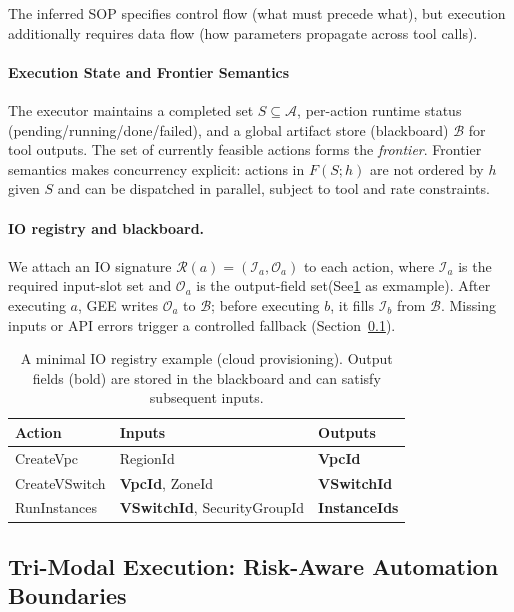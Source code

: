 \documentclass{article}
\theoremstyle{plain}
\theoremstyle{definition}
\theoremstyle{remark}
\begin{document}
The inferred SOP specifies control flow (what must precede what), but execution additionally requires data flow (how parameters propagate across tool calls). 
\paragraph{Execution State and Frontier Semantics}
\label{subsec:frontier}

The executor maintains a completed set $S\subseteq \mathcal{A}$, per-action runtime status (pending/running/done/failed), and a global artifact store (blackboard) $\mathcal{B}$ for tool outputs. The set of currently feasible actions forms the \emph{frontier}. Frontier semantics makes concurrency explicit: actions in $F(S;h)$ are not ordered by $h$ given $S$ and can be dispatched in parallel, subject to tool and rate constraints.

\paragraph{IO registry and blackboard.}
We attach an IO signature $\mathcal{R}(a)=(\mathcal{I}_a,\mathcal{O}_a)$ to each action, where $\mathcal{I}_a$ is the required input-slot set and $\mathcal{O}_a$ is the output-field set(See\ref{tab:io-registry-example} as exmample). After executing $a$, GEE writes $\mathcal{O}_a$ to $\mathcal{B}$; before executing $b$, it fills $\mathcal{I}_b$ from $\mathcal{B}$. Missing inputs or API errors trigger a controlled fallback (Section~\ref{subsec:modes}).

\begin{table}[t]
\centering
\caption{A minimal IO registry example (cloud provisioning). Output fields (bold) are stored in the blackboard and can satisfy subsequent inputs.}
\label{tab:io-registry-example}
\small
\setlength{\tabcolsep}{5pt}
\begin{tabular}{l l l}
\toprule
\textbf{Action} & \textbf{Inputs} & \textbf{Outputs} \\
\midrule
CreateVpc & RegionId & \textbf{VpcId} \\
CreateVSwitch & \textbf{VpcId}, ZoneId & \textbf{VSwitchId} \\
RunInstances & \textbf{VSwitchId}, SecurityGroupId & \textbf{InstanceIds} \\
\bottomrule
\end{tabular}
\end{table}
\subsection{Tri-Modal Execution: Risk-Aware Automation Boundaries}
\label{subsec:modes}
\end{document}
